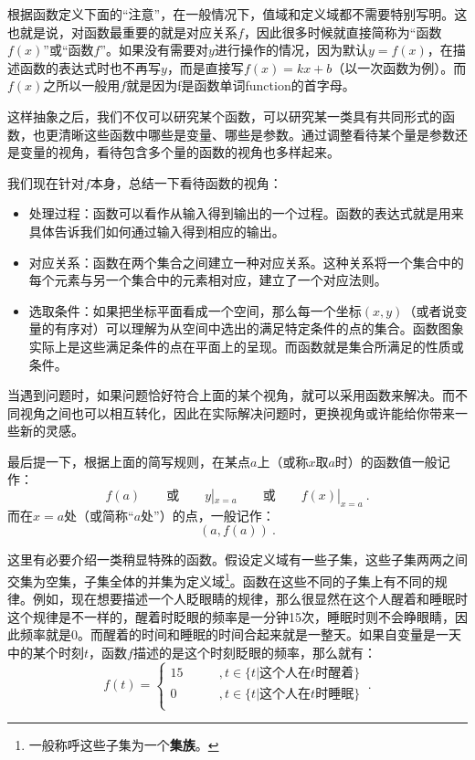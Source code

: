根据函数定义下面的“注意”，在一般情况下，值域和定义域都不需要特别写明。这也就是说，对函数最重要的就是对应关系$f$，因此很多时候就直接简称为“函数$f(x)$”或“函数$f$”。如果没有需要对$y$进行操作的情况，因为默认$y=f(x)$，在描述函数的表达式时也不再写$y$，而是直接写$f(x)=kx+b$（以一次函数为例）。而$f(x)$之所以一般用$f$就是因为f是函数单词function的首字母。

这样抽象之后，我们不仅可以研究某个函数，可以研究某一类具有共同形式的函数，也更清晰这些函数中哪些是变量、哪些是参数。通过调整看待某个量是参数还是变量的视角，看待包含多个量的函数的视角也多样起来。

我们现在针对$f$本身，总结一下看待函数的视角：

\begin{itemize}
\item 处理过程：函数可以看作从输入得到输出的一个过程。函数的表达式就是用来具体告诉我们如何通过输入得到相应的输出。
\item 对应关系：函数在两个集合之间建立一种对应关系。这种关系将一个集合中的每个元素与另一个集合中的元素相对应，建立了一个对应法则。
\item 选取条件：如果把坐标平面看成一个空间，那么每一个坐标$(x,y)$（或者说变量的有序对）可以理解为从空间中选出的满足特定条件的点的集合。函数图象实际上是这些满足条件的点在平面上的呈现。而函数就是集合所满足的性质或条件。
\end{itemize}

当遇到问题时，如果问题恰好符合上面的某个视角，就可以采用函数来解决。而不同视角之间也可以相互转化，因此在实际解决问题时，更换视角或许能给你带来一些新的灵感。

最后提一下，根据上面的简写规则，在某点$a$上（或称$x$取$a$时）的函数值一般记作：
\begin{equation}
f(a)\qquad\text{或}\qquad y|_{x=a}\qquad\text{或}\qquad f(x)|_{x=a}~.
\end{equation}
而在$x=a$处（或简称“$a$处”）的点，一般记作：
\begin{equation}
(a,f(a))~.
\end{equation}

这里有必要介绍一类稍显特殊的函数。假设定义域有一些子集，这些子集两两之间交集为空集，子集全体的并集为定义域\footnote{一般称呼这些子集为一个\textbf{集族}。}。函数在这些不同的子集上有不同的规律。例如，现在想要描述一个人眨眼睛的规律，那么很显然在这个人醒着和睡眠时这个规律是不一样的，醒着时眨眼的频率是一分钟15次，睡眠时则不会睁眼睛，因此频率就是0。而醒着的时间和睡眠的时间合起来就是一整天。如果自变量是一天中的某个时刻$t$，函数$f$描述的是这个时刻眨眼的频率，那么就有：
\begin{equation}
f(t)=
\begin{cases}
15\qquad&,t\in\{t|\text{这个人在}t\text{时醒着}\}\\
0\qquad&,t\in\{t|\text{这个人在}t\text{时睡眠}\}\\
\end{cases}~.
\end{equation}

